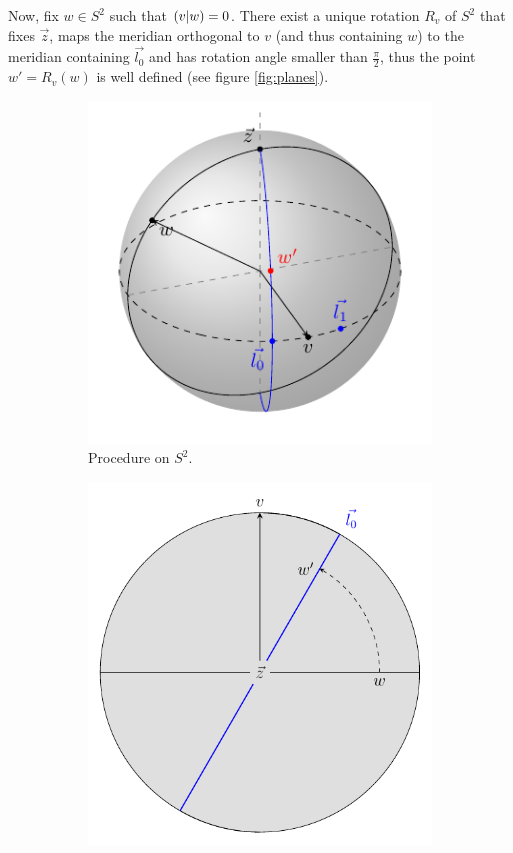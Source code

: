\documentclass[10pt]{article}
\begin{document}
Now, fix $w\in S^2$ such that $\left( v \vert w\right)=0$. There exist a unique rotation $R_v$ of $S^2$ that fixes $\vec{z}$, maps the meridian orthogonal to $v$ (and thus containing $w$) to the meridian containing $\vec{l_0}$ and has rotation angle smaller than $\frac{\pi}{2}$, thus the point $w' = R_v(w)$ is well defined (see figure \ref{fig:planes}).
\begin{figure}[hbt]
  \centering
  \begin{subfigure}[b]{0.4\textwidth}
    \centering
    \includegraphics[width=\textwidth]{construction.pdf}
    \caption{Procedure on $S^2$.}
  \end{subfigure}
  \hfill
  \begin{subfigure}[b]{.4\textwidth}
    \centering
    \includegraphics[width=\textwidth]{xy.pdf}

\end{subfigure}
\end{figure}
\end{document}
